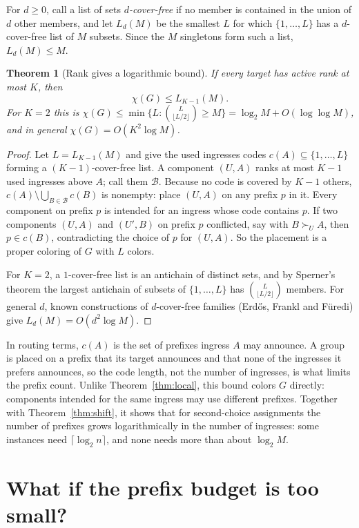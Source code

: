 \documentclass[10pt,a4paper]{article}
\newtheorem{theorem}{Theorem}
\begin{document}
For $d\ge0$, call a list of sets \emph{$d$-cover-free} if no member is contained in the union of $d$ other members, and let $L_d(M)$ be the smallest $L$ for which $\{1,\dots,L\}$ has a $d$-cover-free list of $M$ subsets. Since the $M$ singletons form such a list, $L_d(M)\le M$.

\begin{theorem}[Rank gives a logarithmic bound]\label{thm:coverfree}
If every target has active rank at most $K$, then
\[
\chi(G)\le L_{K-1}(M).
\]
For $K=2$ this is $\chi(G)\le\min\bigl\{L:\binom{L}{\lfloor L/2\rfloor}\ge M\bigr\}=\log_2M+O(\log\log M)$, and in general $\chi(G)=O(K^2\log M)$.
\end{theorem}
\begin{proof}
Let $L=L_{K-1}(M)$ and give the used ingresses codes $c(A)\subseteq\{1,\dots,L\}$ forming a $(K-1)$-cover-free list. A component $(U,A)$ ranks at most $K-1$ used ingresses above $A$; call them $\mathcal B$. Because no code is covered by $K-1$ others, $c(A)\setminus\bigcup_{B\in\mathcal B}c(B)$ is nonempty: place $(U,A)$ on any prefix $p$ in it. Every component on prefix $p$ is intended for an ingress whose code contains $p$. If two components $(U,A)$ and $(U',B)$ on prefix $p$ conflicted, say with $B\succ_U A$, then $p\in c(B)$, contradicting the choice of $p$ for $(U,A)$. So the placement is a proper coloring of $G$ with $L$ colors.

For $K=2$, a $1$-cover-free list is an antichain of distinct sets, and by Sperner's theorem the largest antichain of subsets of $\{1,\dots,L\}$ has $\binom{L}{\lfloor L/2\rfloor}$ members. For general $d$, known constructions of $d$-cover-free families (Erd\H{o}s, Frankl and F\"uredi) give $L_d(M)=O(d^2\log M)$.
\end{proof}

In routing terms, $c(A)$ is the set of prefixes ingress $A$ may announce. A group is placed on a prefix that its target announces and that none of the ingresses it prefers announces, so the code length, not the number of ingresses, is what limits the prefix count. Unlike Theorem~\ref{thm:local}, this bound colors $G$ directly: components intended for the same ingress may use different prefixes. Together with Theorem~\ref{thm:shift}, it shows that for second-choice assignments the number of prefixes grows logarithmically in the number of ingresses: some instances need $\lceil\log_2 n\rceil$, and none needs more than about $\log_2 M$.

\section{What if the prefix budget is too small?}
\label{sec:budget}
\end{document}
